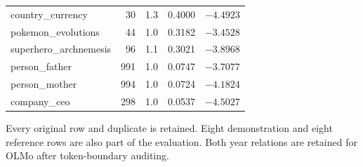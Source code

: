 \begin{table}[t]
\begin{tabular}{@{}lrrrr@{}}
country\_currency & 30 & 1.3 & 0.4000 & $-4.4923$ \\
pokemon\_evolutions & 44 & 1.0 & 0.3182 & $-3.4528$ \\
superhero\_archnemesis & 96 & 1.1 & 0.3021 & $-3.8968$ \\
person\_father & 991 & 1.0 & 0.0747 & $-3.7077$ \\
person\_mother & 994 & 1.0 & 0.0724 & $-4.1824$ \\
company\_ceo & 298 & 1.0 & 0.0537 & $-4.5027$ \\
\bottomrule
\end{tabular}
\par\smallskip\begin{minipage}{\linewidth}\footnotesize Every original row and duplicate is retained. Eight demonstration and eight reference rows are also part of the evaluation. Both year relations are retained for OLMo after token-boundary auditing.\end{minipage}
\end{table}
